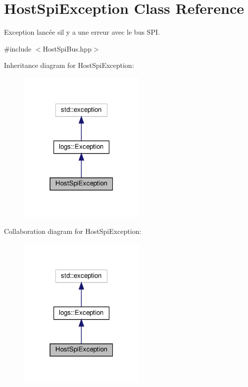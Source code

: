 \hypertarget{classHostSpiException}{}\section{Host\+Spi\+Exception Class Reference}
\label{classHostSpiException}


Exception lancée s\textquotesingle{}il y a une erreur avec le bus S\+PI.  




{\ttfamily \#include $<$Host\+Spi\+Bus.\+hpp$>$}



Inheritance diagram for Host\+Spi\+Exception\+:
\nopagebreak
\begin{figure}[H]
\begin{center}
\leavevmode
\includegraphics[width=175pt]{classHostSpiException__inherit__graph}
\end{center}
\end{figure}


Collaboration diagram for Host\+Spi\+Exception\+:
\nopagebreak
\begin{figure}[H]
\begin{center}
\leavevmode
\includegraphics[width=175pt]{classHostSpiException__coll__graph}
\end{center}
\end{figure}
